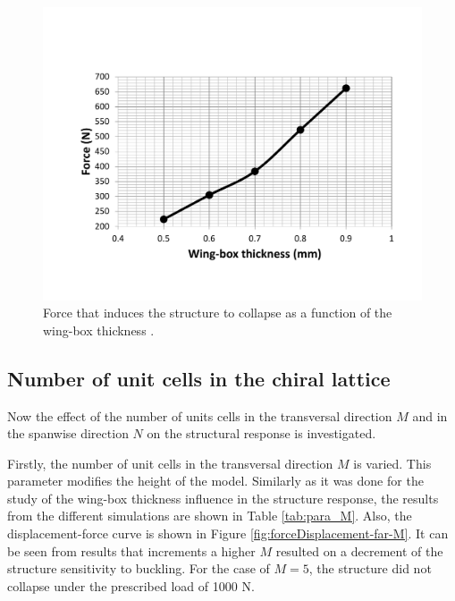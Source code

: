     \begin{figure}[!htpb] %
      \centering
      \includegraphics[width=0.8 \textwidth]{../figures/result-sim/cbox/force_cbox_t}
      \caption[Force that induces the structure to collapse as a function of the wing-box thickness]{Force that induces the structure to collapse as a function of the wing-box thickness \boxt.}\label{fig:force_cbox_t}
    \end{figure}

  \clearpage
  \subsection{Number of unit cells in the chiral lattice} \label{subsec:MandN_para}

    Now the effect of the number of units cells in the transversal direction $M$ and in the spanwise direction $N$ on the structural response is investigated.

    Firstly, the number of unit cells in the transversal direction $M$ is varied. This parameter modifies the height of the model. Similarly as it was done for the study of the wing-box thickness \boxt influence in the structure response, the results from the different simulations are shown in Table \ref{tab:para_M}. Also, the displacement-force curve is shown in Figure \ref{fig:forceDisplacement-far-M}. It can be seen from results that increments a higher $M$ resulted on a decrement of the structure sensitivity to buckling. For the case of $M = 5$, the structure did not collapse under the prescribed load of 1000 N.

